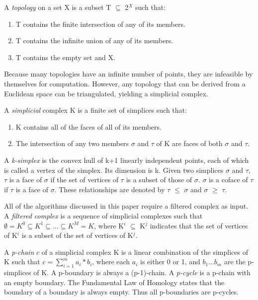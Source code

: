 \documentclass{article}
\begin{document}
A \emph{topology} on a set X is a subset T $\subseteq$ 2$^X$ such that:
\begin{enumerate}
    \item
    T contains the finite intersection of any of its members.
    \item
    T contains the infinite union of any of its members.
    \item
    T contains the empty set and X.
\end{enumerate}

Because many topologies have an infinite number of
points, they are infeasible by themselves for computation. However,
any topology that can be derived from a Euclidean space can be
triangulated, yielding a simplicial complex.

A \emph{simplicial} complex K is a finite set of simplices such that:
\begin{enumerate}
    \item
    K contains all of the faces of all of its members.
    \item
    The intersection of any two members $\sigma$ and $\tau$ of K are faces of
    both $\sigma$ and $\tau$.
\end{enumerate}

A \emph{k-simplex}
is the convex hull of k+1 linearly independent points, each of which is
called a vertex of the simplex. Its dimension is k.
Given two simplices $\sigma$ and $\tau$, $\tau$ is
a face of $\sigma$ if the set of vertices of $\tau$ is a subset
of those of $\sigma$. $\sigma$ is a coface of $\tau$ if $\tau$ is a
face of $\sigma$.  These relationships are denoted by
$\tau$ $\leq$ $\sigma$ and $\sigma$ $\geq$ $\tau$.

All of the algorithms discussed in this paper require a filtered
complex as input. A \emph{filtered complex} is a sequence of
simplicial complexes such that
\( \emptyset = K^0 \subseteq K^1 \subseteq ... \subseteq K^M = K \),
where K$^i$ $\subseteq$ K$^j$ indicates that the set of vertices of
K$^i$ is a subset of the set of vertices of K$^j$.

A \emph{p-chain} $c$ of a simplicial complex K is a linear combination
of the simplices of K such that
$c = \sum_{i=1}^{m} a_i * b_i$, where each $a_i$ is either 0 or 1, and
$b_1$...$b_m$ are the p-simplices of K.  A p-boundary is
always a (p-1)-chain. A \emph{p-cycle}
is a p-chain with an empty boundary. The Fundamental Law of Homology
states that the boundary of a boundary is always empty.
Thus all p-boundaries are p-cycles.
\end{document}
